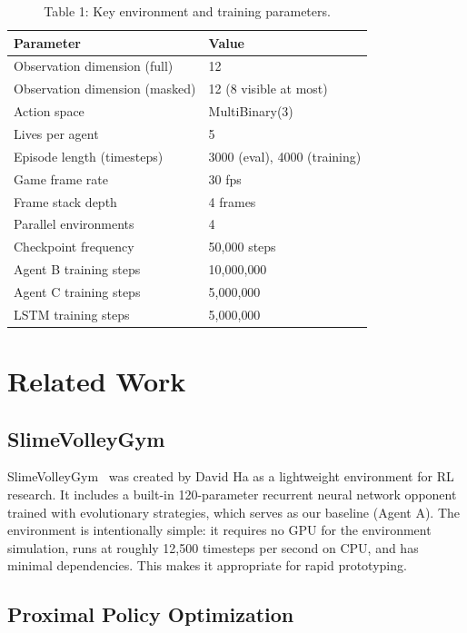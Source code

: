 \documentclass[conference]{IEEEtran}
\begin{document}
\begin{table}[h]
\caption{Table 1: Key environment and training parameters.}
\label{tab:params}
\begin{center}
\begin{tabular}{|l|l|}
\hline
\textbf{Parameter} & \textbf{Value} \\
\hline
Observation dimension (full) & 12 \\
\hline
Observation dimension (masked) & 12 (8 visible at most) \\
\hline
Action space & MultiBinary(3) \\
\hline
Lives per agent & 5 \\
\hline
Episode length (timesteps) & 3000 (eval), 4000 (training) \\
\hline
Game frame rate & 30 fps \\
\hline
Frame stack depth & 4 frames \\
\hline
Parallel environments & 4 \\
\hline
Checkpoint frequency & 50{,}000 steps \\
\hline
\hline
Agent B training steps & 10{,}000{,}000 \\
\hline
Agent C training steps & 5{,}000{,}000 \\
\hline
LSTM training steps & 5{,}000{,}000 \\
\hline
\end{tabular}
\end{center}
\end{table}


\section{Related Work}

\subsection{SlimeVolleyGym}

SlimeVolleyGym~\cite{slimevolleygym} was created by David Ha as a lightweight environment for RL research. It includes a built-in 120-parameter recurrent neural network opponent trained with evolutionary strategies, which serves as our baseline (Agent A). The environment is intentionally simple: it requires no GPU for the environment simulation, runs at roughly 12,500 timesteps per second on CPU, and has minimal dependencies. This makes it appropriate for rapid prototyping.

\subsection{Proximal Policy Optimization}
\end{document}
